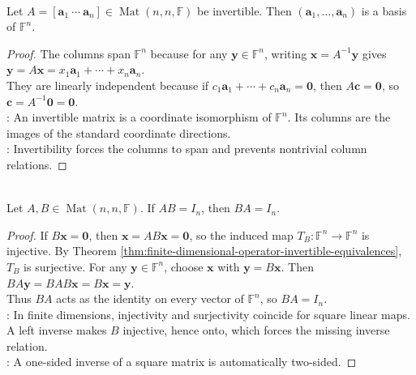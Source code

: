 \begin{theorem} \label{thm:invertible-matrix-columns-basis} \\
Let $A=[\mathbf{a}_1\ \cdots\ \mathbf{a}_n]\in\operatorname{Mat}(n,n,\mathbb{F})$ be invertible. Then $(\mathbf{a}_1,\ldots,\mathbf{a}_n)$ is a basis of $\mathbb{F}^n$.
\begin{proof}
The columns span $\mathbb{F}^n$ because for any $\mathbf{y}\in\mathbb{F}^n$, writing $\mathbf{x}=A^{-1}\mathbf{y}$ gives $\mathbf{y}=A\mathbf{x}=x_1\mathbf{a}_1+\cdots+x_n\mathbf{a}_n$.\\
They are linearly independent because if $c_1\mathbf{a}_1+\cdots+c_n\mathbf{a}_n=\mathbf{0}$, then $A\mathbf{c}=\mathbf{0}$, so $\mathbf{c}=A^{-1}\mathbf{0}=\mathbf{0}$.\\
: An invertible matrix is a coordinate isomorphism of $\mathbb{F}^n$. Its columns are the images of the standard coordinate directions.\\
: Invertibility forces the columns to span and prevents nontrivial column relations.
\end{proof}
\end{theorem}

\begin{theorem} \label{thm:square-one-sided-inverse-is-two-sided} \\
Let $A,B\in\operatorname{Mat}(n,n,\mathbb{F})$. If $AB=I_n$, then $BA=I_n$.
\begin{proof}
If $B\mathbf{x}=\mathbf{0}$, then $\mathbf{x}=AB\mathbf{x}=\mathbf{0}$, so the induced map $T_B:\mathbb{F}^n\to\mathbb{F}^n$ is injective. By Theorem \ref{thm:finite-dimensional-operator-invertible-equivalences}, $T_B$ is surjective. For any $\mathbf{y}\in\mathbb{F}^n$, choose $\mathbf{x}$ with $\mathbf{y}=B\mathbf{x}$. Then $BA\mathbf{y}=BAB\mathbf{x}=B\mathbf{x}=\mathbf{y}$.\\
Thus $BA$ acts as the identity on every vector of $\mathbb{F}^n$, so $BA=I_n$.\\
: In finite dimensions, injectivity and surjectivity coincide for square linear maps. A left inverse makes $B$ injective, hence onto, which forces the missing inverse relation.\\
: A one-sided inverse of a square matrix is automatically two-sided.
\end{proof}
\end{theorem}

